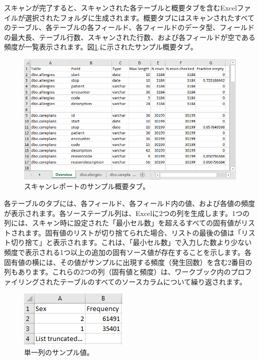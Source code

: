 \documentclass[
  11pt]{book}
\theoremstyle{definition}
\theoremstyle{definition}
\theoremstyle{definition}
\theoremstyle{definition}
\theoremstyle{remark}
\begin{document}
スキャンが完了すると、スキャンされた各テーブルと概要タブを含むExcelファイルが選択されたフォルダに生成されます。概要タブにはスキャンされたすべてのテーブル、各テーブルの各フィールド、各フィールドのデータ型、フィールドの最大長、テーブル行数、スキャンされた行数、および各フィールドが空である頻度が一覧表示されます。図\ref{fig:ScanOverviewTab}.に示されたサンプル概要タブ。

\begin{figure}

{\centering \includegraphics[width=1\linewidth]{images/ExtractTransformLoad/ScanOverviewTab} 

}

\caption{スキャンレポートのサンプル概要タブ。}\label{fig:ScanOverviewTab}
\end{figure}

各テーブルのタブには、各フィールド、各フィールド内の値、および各値の頻度が表示されます。各ソーステーブル列は、Excelに2つの列を生成します。1つの列には、スキャン時に設定された「最小セル数」を超えるすべての固有値がリストされます。固有値のリストが切り捨てられた場合、リストの最後の値は「リスト切り捨て」と表示されます。これは、「最小セル数」で入力した数より少ない頻度で表示される1つ以上の追加の固有ソース値が存在することを示します。各固有値の横には、その値がサンプルに出現する頻度（発生回数）を含む2番目の列もあります。これらの2つの列（固有値と頻度）は、ワークブック内のプロファイリングされたテーブルのすべてのソースカラムについて繰り返されます。

\begin{figure}

{\centering \includegraphics[width=0.3\linewidth]{images/ExtractTransformLoad/ScanSex} 

}

\caption{単一列のサンプル値。}\label{fig:scanSex}
\end{figure}
\end{document}
